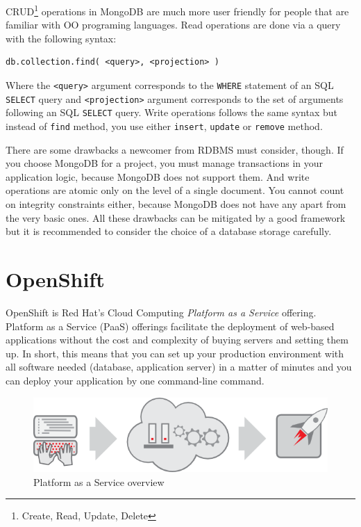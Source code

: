 CRUD\footnote{Create, Read, Update, Delete} operations in MongoDB are much more user friendly for people that are familiar with OO programing languages. Read operations are done via a query with the following syntax:

\begin{verbatim}
db.collection.find( <query>, <projection> )
\end{verbatim}

Where the \texttt{<query>} argument corresponds to the \texttt{WHERE} statement of an SQL \texttt{SELECT} query and \texttt{<projection>} argument corresponds to the set of arguments following an SQL \texttt{SELECT} query. Write operations follows the same syntax but instead of \texttt{find} method, you use either \texttt{insert}, \texttt{update} or \texttt{remove} method.

There are some drawbacks a newcomer from RDBMS must consider, though. If you choose MongoDB for a project, you must manage transactions in your application logic, because MongoDB does not support them. And write operations are atomic only on the level of a single document. You cannot count on integrity constraints either, because MongoDB does not have any apart from the very basic ones. All these drawbacks can be mitigated by a good framework but it is recommended to consider the choice of a database storage carefully.

\section{OpenShift}

OpenShift is Red Hat's Cloud Computing \emph{Platform as a Service} offering\cite{openshift-homepage}. Platform as a Service (PaaS) offerings facilitate the deployment of web-based applications without the cost and complexity of buying servers and setting them up\cite{guardian-google-paas}. In short, this means that you can set up your production environment with all software needed (database, application server) in a matter of minutes and you can deploy your application by one command-line command.

\begin{figure}[htbp]
    \centering
        \includegraphics[scale=0.5]{./images/overview-paas.png}
    \caption{Platform as a Service overview}
    \label{fig:overview-paas}
\end{figure}

